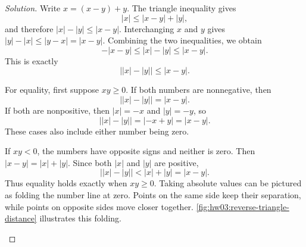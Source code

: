 \begin{proof}[Solution]
  Write $x=(x-y)+y$. The triangle inequality gives
  \[
    |x|\leq|x-y|+|y|,
  \]
  and therefore $|x|-|y|\leq|x-y|$. Interchanging $x$ and $y$ gives
  $|y|-|x|\leq|y-x|=|x-y|$. Combining the two inequalities, we obtain
  \[
    -|x-y|\leq|x|-|y|\leq|x-y|.
  \]
  This is exactly
  \[
    \bigl||x|-|y|\bigr|\leq|x-y|.
  \]

  For equality, first suppose $xy\geq0$. If both numbers are
  nonnegative, then
  \[
    \bigl||x|-|y|\bigr|=|x-y|.
  \]
  If both are nonpositive, then $|x|=-x$ and $|y|=-y$, so
  \[
    \bigl||x|-|y|\bigr|=|-x+y|=|x-y|.
  \]
  These cases also include either number being zero.

  If $xy<0$, the numbers have opposite signs and neither is zero.
  Then $|x-y|=|x|+|y|$. Since both $|x|$ and $|y|$ are positive,
  \[
    \bigl||x|-|y|\bigr|<|x|+|y|=|x-y|.
  \]
  Thus equality holds exactly when $xy\geq0$. Taking absolute values
  can be pictured as folding the number line at zero. Points on the
  same side keep their separation, while points on opposite sides
  move closer together. \autoref{fig:hw03:reverse-triangle-distance}
  illustrates this folding.
  \begin{marginfigure}
    \centering
    
    \caption[Folding the number line at zero.]{Schematic folding by $t\mapsto|t|$.
      Both rows use the same scale. Here $y<0<x<|y|$, and the gap shrinks
      from $|x-y|$ to $\bigl||x|-|y|\bigr|$. Points on the same half-line
      keep their separation.}
    \label{fig:hw03:reverse-triangle-distance}
  \end{marginfigure}
\end{proof}
